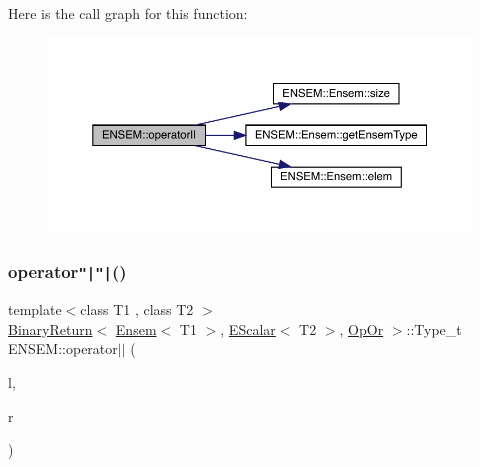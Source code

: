 Here is the call graph for this function\+:\nopagebreak
\begin{figure}[H]
\begin{center}
\leavevmode
\includegraphics[width=350pt]{d1/d9e/group__eensem_ga5e2d1d875f2929ebe89f76b2d73b0a34_cgraph}
\end{center}
\end{figure}
\mbox{\label{group__eensem_ga575e86e9777d7a353311ab43c237a84b}} 
\subsubsection{\texorpdfstring{operator\texttt{"|}\texttt{"|}()}{operator||()}\hspace{0.1cm}{\footnotesize\ttfamily [2/3]}}
{\footnotesize\ttfamily template$<$class T1 , class T2 $>$ \\
\mbox{\hyperlink{structENSEM_1_1BinaryReturn}{Binary\+Return}}$<$ \mbox{\hyperlink{classENSEM_1_1Ensem}{Ensem}}$<$ T1 $>$, \mbox{\hyperlink{classENSEM_1_1EScalar}{E\+Scalar}}$<$ T2 $>$, \mbox{\hyperlink{structENSEM_1_1OpOr}{Op\+Or}} $>$\+::Type\+\_\+t E\+N\+S\+E\+M\+::operator$\vert$$\vert$ (\begin{DoxyParamCaption}\item[{const \mbox{\hyperlink{classENSEM_1_1Ensem}{Ensem}}$<$ T1 $>$ \&}]{l,  }\item[{const \mbox{\hyperlink{classENSEM_1_1EScalar}{E\+Scalar}}$<$ T2 $>$ \&}]{r }\end{DoxyParamCaption})\hspace{0.3cm}{\ttfamily [inline]}}

